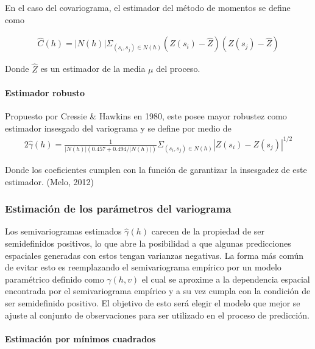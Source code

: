 En el caso del covariograma, el estimador del método de momentos se define como

\begin{equation*}
\begin{aligned}
   \hat{C}(h)  = |N(h)| \Sigma_{(s_i, s_j) \in N(h)}  (Z(s_i) - \hat{Z}) (Z(s_j) - \hat{Z})
\end{aligned}
\end{equation*}

Donde $\hat{Z}$ es un estimador de la media $\mu$ del proceso.

\paragraph{Estimador robusto}

Propuesto por Cressie & Hawkins en 1980, este posee mayor robustez como estimador insesgado del variograma y se define por medio de
\begin{equation*}
\begin{aligned}
   2\hat{\gamma}(h)  = \frac{1}{|N(h)| (0.457 + 0.494/ |N(h)| ) }\Sigma_{(s_i, s_j) \in N(h)}  |Z(s_i) - Z(s_j)|^{1/2}
\end{aligned}
\end{equation*}

Donde los coeficientes cumplen con la función de garantizar la insesgadez de este estimador. (Melo, 2012) \cite{melo}

\subsubsection{Estimación de los parámetros del variograma}

Los semivariogramas estimados $\hat{\gamma}(h)$
carecen de la propiedad de ser semidefinidos positivos, lo que
abre la posibilidad a que algunas predicciones espaciales generadas con estos tengan varianzas
negativas. La forma más común de evitar esto es reemplazando el semivariograma empírico por un
modelo paramétrico definido como $\gamma(h,v)$
el cual se aproxime a la dependencia espacial encontrada
por el semivariograma empírico y a su vez cumpla con la condición de ser semidefinido positivo. El
objetivo de esto será elegir el modelo que mejor se ajuste al conjunto de observaciones para ser
utilizado en el proceso de predicción.

\paragraph{Estimación por mínimos cuadrados}

